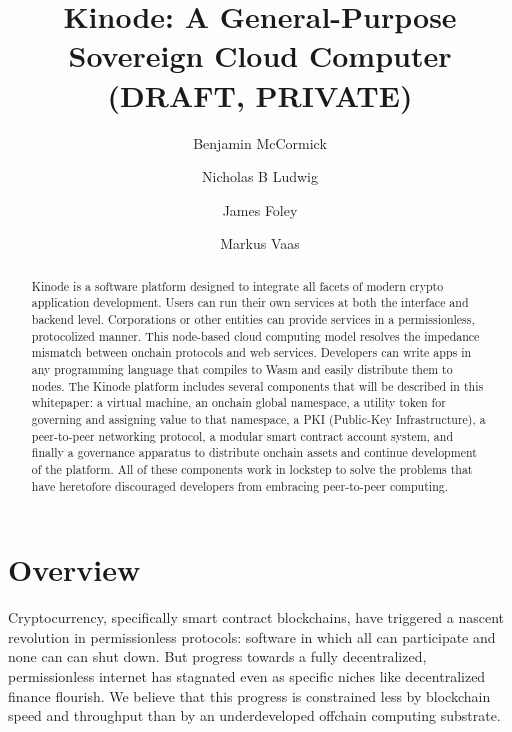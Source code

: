 \documentclass[runningheads]{llncs}
\begin{document}
%
\title{Kinode: A General-Purpose Sovereign Cloud Computer (DRAFT, PRIVATE)}
%
%
\author{
Benjamin McCormick \and
Nicholas B Ludwig \and
James Foley \and
Markus Vaas
}
%
\maketitle %
%
\begin{abstract}
Kinode is a software platform designed to integrate all facets of modern crypto application development.
Users can run their own services at both the interface and backend level.
Corporations or other entities can provide services in a permissionless, protocolized manner.
This node-based cloud computing model resolves the impedance mismatch between onchain protocols and web services.
Developers can write apps in any programming language that compiles to Wasm and easily distribute them to nodes.
The Kinode platform includes several components that will be described in this whitepaper: a virtual machine, an onchain global namespace, a utility token for governing and assigning value to that namespace, a PKI (Public-Key Infrastructure), a peer-to-peer networking protocol, a modular smart contract account system, and finally a governance apparatus to distribute onchain assets and continue development of the platform.
All of these components work in lockstep to solve the problems that have heretofore discouraged developers from embracing peer-to-peer computing.

\end{abstract}
%
\tableofcontents
%
%
%
%
\section{Overview}
\label{sec:overview}

Cryptocurrency, specifically smart contract blockchains, have triggered a nascent revolution in permissionless protocols: software in which all can participate and none can can shut down.
But progress towards a fully decentralized, permissionless internet has stagnated even as specific niches like decentralized finance flourish.
We believe that this progress is constrained less by blockchain speed and throughput than by an underdeveloped offchain computing substrate.
\end{document}
